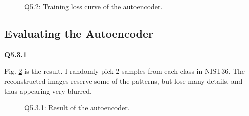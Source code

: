 \documentclass[
  course = {{16-720B Computer Vision}},
  quartile = {{1}},
  assignment = 3-Neural\ Networks\ for\ Recognition,
  name = {{Kangle Deng}},
  email = {{kangled@andrew.cmu.edu}},
  firstexercise = 1
]{aga-homework}
\begin{document}
\begin{figure}
    \centering
    \caption{Q5.2: Training loss curve of the autoencoder.}
    \label{fig:cv_hw3_q52}
\end{figure}

\subsection{Evaluating the Autoencoder}
\noindent \textbf{Q5.3.1}

Fig. \ref{fig:cv_hw3_q531} is the result. I randomly pick 2 samples from each class in NIST36. The reconstructed images reserve some of the patterns, but lose many details, and thus appearing very blurred.

\begin{figure}
    \centering
    \caption{Q5.3.1: Result of the autoencoder.}
    \label{fig:cv_hw3_q531}
\end{figure}
\end{document}
